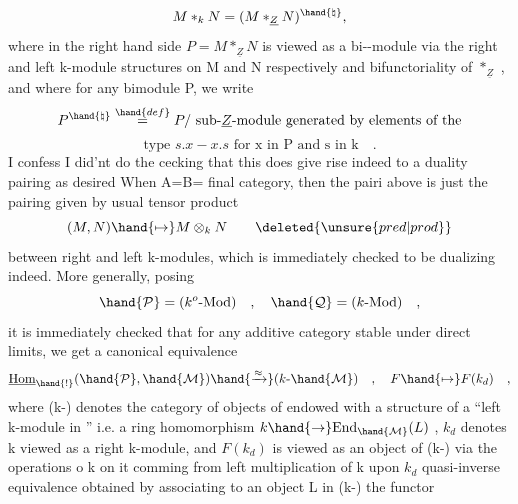 \[M *_{k} N = (M *_{\underline{Z}} N)^{\hand{\natural}} ,\]
where in the right hand side $P = M *_{\underline{Z}} N$ is viewed as a bi--module
via the right and left k-module structures on M and N respectively and
bifunctoriality of $*_{\underline{Z}}$ , and where for any  bimodule P, we write
\[P^{\hand{\natural}} \overset{\hand{def}}{=} P/ \text{ sub-$\underline{Z}$-module generated by elements of the}\]
\[\text{type } s.x - x.s \text{ for x in P and s in k} \quad .\]
\deleted{(}I confess I did'nt do the cecking that this does give rise indeed to a
duality pairing as desired\deleted{)} When A=B= final category, then the 
pairi above is just the pairing given by usual tensor product
\[(M,N)\hand{\mapsto} M\otimes_{k}N \qquad \deleted{\unsure{pred|prod}}\]
between right and left k-modules, which is immediately checked to be
dualizing indeed. More generally, posing
\[\hand{\mathcal{P}}= (k^{o}\text{-Mod}) \quad , \quad \hand{\mathcal{Q}}= (k\text{-Mod}) \quad ,\]
it is immediately checked that for any additive category  stable under
 direct limits, we get a canonical equivalence
\[\underline{\text{Hom}}_{\hand{!}}(\hand{\mathcal{P}},\hand{\mathcal{M}}) \hand{\xrightarrow{\approx}} (k\text{-}\hand{\mathcal{M}}) \quad , \quad F \hand{\mapsto} F(k_{d}) \quad ,\]
where (k-) denotes the category of objects  of  endowed with a
structure  of a ``left k-module in '' i.e. a ring homomorphism
$k\hand{\to} \text{End}_{\hand{\mathcal{M}}}(L)$ , $k_{d}$ denotes k viewed as a right k-module, and $F(k_{d})$ is 
viewed as an object of (k-) via the operations o k on it comming from
left multiplication of k upon $k_{d}$   quasi-inverse equivalence  
obtained by associating to an object L in (k-) the functor
